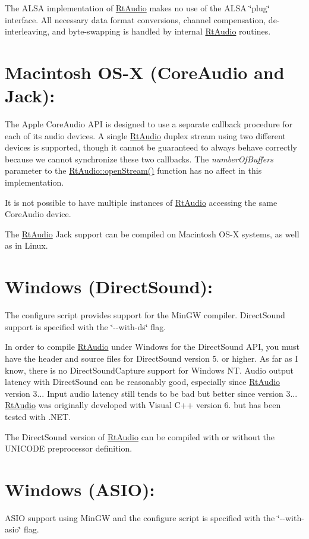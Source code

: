 The A\+L\+SA implementation of \hyperlink{class_rt_audio}{Rt\+Audio} makes no use of the A\+L\+SA \char`\"{}plug\char`\"{} interface. All necessary data format conversions, channel compensation, de-\/interleaving, and byte-\/swapping is handled by internal \hyperlink{class_rt_audio}{Rt\+Audio} routines.\hypertarget{apinotes_macosx}{}\section{Macintosh O\+S-\/\+X (\+Core\+Audio and Jack)\+:}\label{apinotes_macosx}
The Apple Core\+Audio A\+PI is designed to use a separate callback procedure for each of its audio devices. A single \hyperlink{class_rt_audio}{Rt\+Audio} duplex stream using two different devices is supported, though it cannot be guaranteed to always behave correctly because we cannot synchronize these two callbacks. The {\itshape number\+Of\+Buffers} parameter to the \hyperlink{class_rt_audio_a6907539d2527775df778ebce32ef1e3b}{Rt\+Audio\+::open\+Stream()} function has no affect in this implementation.

It is not possible to have multiple instances of \hyperlink{class_rt_audio}{Rt\+Audio} accessing the same Core\+Audio device.

The \hyperlink{class_rt_audio}{Rt\+Audio} Jack support can be compiled on Macintosh O\+S-\/X systems, as well as in Linux.\hypertarget{apinotes_windowsds}{}\section{Windows (\+Direct\+Sound)\+:}\label{apinotes_windowsds}
The {\ttfamily configure} script provides support for the Min\+GW compiler. Direct\+Sound support is specified with the \char`\"{}-\/-\/with-\/ds\char`\"{} flag.

In order to compile \hyperlink{class_rt_audio}{Rt\+Audio} under Windows for the Direct\+Sound A\+PI, you must have the header and source files for Direct\+Sound version 5. or higher. As far as I know, there is no Direct\+Sound\+Capture support for Windows NT. Audio output latency with Direct\+Sound can be reasonably good, especially since \hyperlink{class_rt_audio}{Rt\+Audio} version 3... Input audio latency still tends to be bad but better since version 3... \hyperlink{class_rt_audio}{Rt\+Audio} was originally developed with Visual C++ version 6. but has been tested with .N\+ET.

The Direct\+Sound version of \hyperlink{class_rt_audio}{Rt\+Audio} can be compiled with or without the U\+N\+I\+C\+O\+DE preprocessor definition.\hypertarget{apinotes_windowsasio}{}\section{Windows (\+A\+S\+I\+O)\+:}\label{apinotes_windowsasio}
A\+S\+IO support using Min\+GW and the {\ttfamily configure} script is specified with the \char`\"{}-\/-\/with-\/asio\char`\"{} flag.

